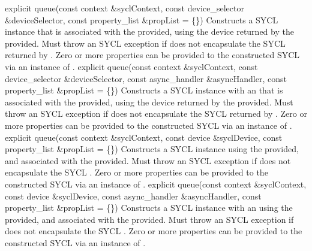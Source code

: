   \addRowThreeL
    { explicit queue(const context \&syclContext, }
    { const device_selector \&deviceSelector, }
    { const property_list \&propList = \{\}) }
    {
      Constructs a SYCL  instance that is associated with the
       provided, using the device returned by the
       provided. Must throw an
       SYCL exception if
       does not encapsulate the SYCL
       returned by . Zero or more
      properties can be provided to the constructed SYCL 
      via an instance of .
    }
  \addRowFourL
    { explicit queue(const context \&syclContext, }
    { const device_selector \&deviceSelector, }
    { const async_handler \&asyncHandler, }
    { const property_list \&propList = \{\}) }
    {
      Constructs a SYCL  instance with an  that is associated with the 
      provided, using the device returned by the 
      provided. Must throw an  SYCL exception
      if  does not encapsulate the SYCL
       returned by . Zero or more
      properties can be provided to the constructed SYCL  via
      an instance of .
    }
  \addRowThreeL
    { explicit queue(const context \&syclContext, }
    { const device \&syclDevice, }
    { const property_list \&propList = \{\}) }
    {
      Constructs a SYCL  instance using the  provided, and associated with the
       provided. Must throw an
       SYCL exception if
       does not encapsulate the SYCL
       . Zero or more
      properties can be provided to the constructed SYCL 
      via an instance of .
    }
  \addRowFourL
    { explicit queue(const context \&syclContext, }
    { const device \&syclDevice, }
    { const async_handler \&asyncHandler, }
    { const property_list \&propList = \{\}) }
    {
      Constructs a SYCL  instance with an  using the  provided, and
      associated with the  provided. Must throw an
       SYCL exception if
       does not encapsulate the SYCL
       .  Zero or more
      properties can be provided to the constructed SYCL  via
      an instance of .
    }
